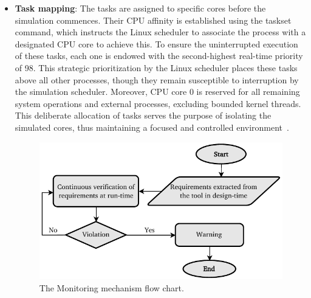 \begin{itemize}
    \item \textbf{Task mapping}: 
    The tasks are assigned to specific cores before the simulation commences. Their CPU affinity is established using the taskset command, which instructs the Linux scheduler to associate the process with a designated CPU core to achieve this. To ensure the uninterrupted execution of these tasks, each one is endowed with the second-highest real-time priority of 98. This strategic prioritization by the Linux scheduler places these tasks above all other processes, though they remain susceptible to interruption by the simulation scheduler.
    Moreover, CPU core 0 is reserved for all remaining system operations and external processes, excluding bounded kernel threads. This deliberate allocation of tasks serves the purpose of isolating the simulated cores, thus maintaining a focused and controlled environment~\cite{askaripoor2023designer}.
    
    
        
    
          \begin{figure}[b!]
    \centering
    \includegraphics[width=0.8\columnwidth]{figures/monitoring_fc.pdf}
    \caption{The Monitoring mechanism flow chart.}
    \label{fig77}
    \end{figure}
    

\end{itemize}
